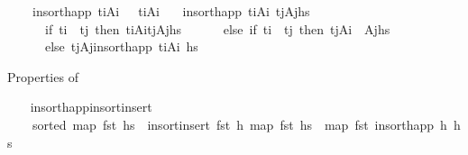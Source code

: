 \begin{isabellebody}
\ \ \ \ {\isachardoublequoteopen}insort{\isacharunderscore}{\kern0pt}happ\ {\isacharparenleft}{\kern0pt}t\isactrlsub i{\isacharcomma}{\kern0pt}A\isactrlsub i{\isacharparenright}{\kern0pt}\ {\isacharbrackleft}{\kern0pt}{\isacharbrackright}{\kern0pt}\ {\isacharequal}{\kern0pt}\ {\isacharbrackleft}{\kern0pt}{\isacharparenleft}{\kern0pt}t\isactrlsub i{\isacharcomma}{\kern0pt}A\isactrlsub i{\isacharparenright}{\kern0pt}{\isacharbrackright}{\kern0pt}{\isachardoublequoteclose}\isanewline
\ \ {\isacharbar}{\kern0pt}\ {\isachardoublequoteopen}insort{\isacharunderscore}{\kern0pt}happ\ {\isacharparenleft}{\kern0pt}t\isactrlsub i{\isacharcomma}{\kern0pt}A\isactrlsub i{\isacharparenright}{\kern0pt}\ {\isacharparenleft}{\kern0pt}{\isacharparenleft}{\kern0pt}t\isactrlsub j{\isacharcomma}{\kern0pt}A\isactrlsub j{\isacharparenright}{\kern0pt}{\isacharhash}{\kern0pt}hs{\isacharparenright}{\kern0pt}\ {\isacharequal}{\kern0pt}\ \isanewline
\ \ \ \ \ \ {\isacharparenleft}{\kern0pt}if\ t\isactrlsub i\ {\isacharless}{\kern0pt}\ t\isactrlsub j\ then\ {\isacharparenleft}{\kern0pt}t\isactrlsub i{\isacharcomma}{\kern0pt}A\isactrlsub i{\isacharparenright}{\kern0pt}{\isacharhash}{\kern0pt}{\isacharparenleft}{\kern0pt}t\isactrlsub j{\isacharcomma}{\kern0pt}A\isactrlsub j{\isacharparenright}{\kern0pt}{\isacharhash}{\kern0pt}hs\isanewline
\ \ \ \ \ \ else\ if\ t\isactrlsub i\ {\isacharequal}{\kern0pt}\ t\isactrlsub j\ then\ {\isacharparenleft}{\kern0pt}t\isactrlsub j{\isacharcomma}{\kern0pt}A\isactrlsub i\ {\isacharat}{\kern0pt}\ A\isactrlsub j{\isacharparenright}{\kern0pt}{\isacharhash}{\kern0pt}hs\isanewline
\ \ \ \ \ \ else\ {\isacharparenleft}{\kern0pt}t\isactrlsub j{\isacharcomma}{\kern0pt}A\isactrlsub j{\isacharparenright}{\kern0pt}{\isacharhash}{\kern0pt}{\isacharparenleft}{\kern0pt}insort{\isacharunderscore}{\kern0pt}happ\ {\isacharparenleft}{\kern0pt}t\isactrlsub i{\isacharcomma}{\kern0pt}A\isactrlsub i{\isacharparenright}{\kern0pt}\ hs{\isacharparenright}{\kern0pt}{\isacharparenright}{\kern0pt}{\isachardoublequoteclose}%
\begin{isamarkuptext}%
Properties of %
\end{isamarkuptext}\isamarkuptrue%
\ \ \isamarkupfalse%
\ insort{\isacharunderscore}{\kern0pt}happ{\isacharunderscore}{\kern0pt}insort{\isacharunderscore}{\kern0pt}insert{\isacharcolon}{\kern0pt}\ \isanewline
\ \ \ \ {\isachardoublequoteopen}sorted\ {\isacharparenleft}{\kern0pt}map\ fst\ hs{\isacharparenright}{\kern0pt}\ {\isasymLongrightarrow}\ insort{\isacharunderscore}{\kern0pt}insert\ {\isacharparenleft}{\kern0pt}fst\ h{\isacharparenright}{\kern0pt}\ {\isacharparenleft}{\kern0pt}map\ fst\ hs{\isacharparenright}{\kern0pt}\ {\isacharequal}{\kern0pt}\ map\ fst\ {\isacharparenleft}{\kern0pt}insort{\isacharunderscore}{\kern0pt}happ\ h\ hs{\isacharparenright}{\kern0pt}{\isachardoublequoteclose}\isanewline

\end{isabellebody}
